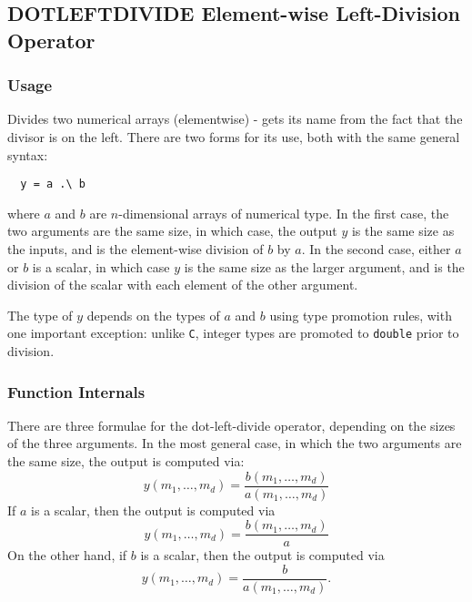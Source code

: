%
%
%
\subsection{DOTLEFTDIVIDE Element-wise Left-Division Operator}
\subsubsection{Usage}
Divides two numerical arrays (elementwise) - gets its name from the 
fact that the divisor is on the left.  There are two forms
for its use, both with the same general syntax:
\begin{verbatim}
  y = a .\ b
\end{verbatim}
where $a$ and $b$ are $n$-dimensional arrays of numerical type.  In the
first case, the two arguments are the same size, in which case, the 
output $y$ is the same size as the inputs, and is the element-wise
division of $b$ by $a$.  In the second case, either $a$ or $b$ is a scalar, 
in which case $y$ is the same size as the larger argument,
and is the division of the scalar with each element of the other argument.

The type of $y$ depends on the types of $a$ and $b$ using type 
promotion rules, with one important exception: unlike \verb|C|, integer
types are promoted to \verb|double| prior to division.
\subsubsection{Function Internals}
There are three formulae for the dot-left-divide operator, depending on the
sizes of the three arguments.  In the most general case, in which 
the two arguments are the same size, the output is computed via:
\[
y(m_1,\ldots,m_d) = \frac{b(m_1,\ldots,m_d)}{a(m_1,\ldots,m_d)}
\]
If $a$ is a scalar, then the output is computed via
\[
y(m_1,\ldots,m_d) = \frac{b(m_1,\ldots,m_d)}{a}
\]
On the other hand, if $b$ is a scalar, then the output is computed via
\[
y(m_1,\ldots,m_d) = \frac{b}{a(m_1,\ldots,m_d)}.
\]
